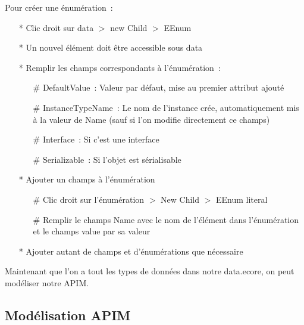 \documentclass{article}
\begin{document}
Pour cr\'eer une \'enum\'eration~:
\begin{itemize}
\item[*] Clic droit sur data $>$ new Child $>$ EEnum
\item[*] Un nouvel \'el\'ement doit \^etre accessible sous data
\item[*] Remplir les champs correspondants \`a l'\'enum\'eration~:
  \begin{itemize}
  \item[\#] DefaultValue~: Valeur par d\'efaut, mise au premier attribut ajout\'e
  \item[\#] InstanceTypeName~: Le nom de l'instance cr\'ee, automatiquement mis \`a la valeur de Name (sauf si l'on modifie directement ce champs)
  \item[\#] Interface~: Si c'est une interface
  \item[\#] Serializable~: Si l'objet est s\'erialisable
  \end{itemize}
\item[*] Ajouter un champs \`a l'\'enum\'eration
  \begin{itemize}
  \item[\#] Clic droit sur l'\'enum\'eration $>$ New Child $>$ EEnum literal
  \item[\#] Remplir le champs Name avec le nom de l'\'el\'ement dans l'\'enum\'eration et le champs value par sa valeur
  \end{itemize}
\item[*] Ajouter autant de champs et d'\'enum\'erations que n\'ecessaire
\end{itemize}


Maintenant que l'on a tout les types de donn\'ees dans notre data.ecore, on peut mod\'eliser notre APIM.

\subsection*{Mod\'elisation APIM}
\end{document}
